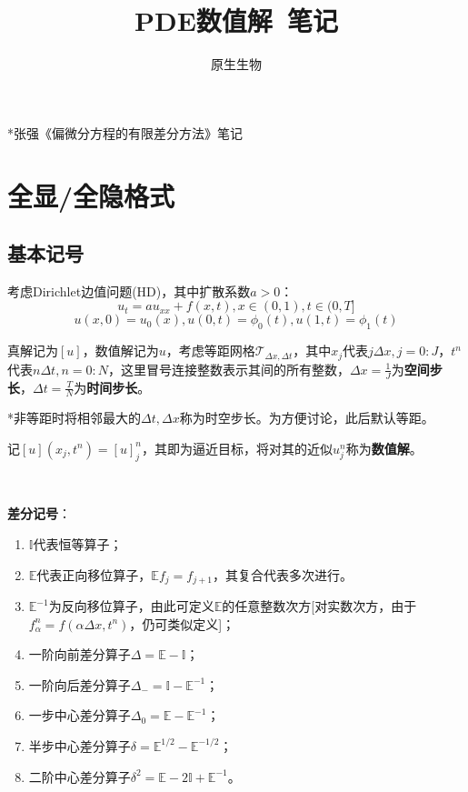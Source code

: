 \documentclass[a4paper,UTF8,fontset=windows]{ctexart}
\title{\textbf{PDE数值解\ 笔记}}
\author{原生生物}
\date{}
\begin{document}
\maketitle

*张强《偏微分方程的有限差分方法》笔记

\tableofcontents

\newpage

\section{全显/全隐格式}
\subsection{基本记号}
考虑Dirichlet边值问题(HD)，其中扩散系数$a>0$：
$$u_t=au_{xx}+f(x,t),x\in(0,1),t\in(0,T]$$
$$u(x,0)=u_0(x),u(0,t)=\phi_0(t),u(1,t)=\phi_1(t)$$

真解记为$[u]$，数值解记为$u$，考虑等距网格$\mathcal{T}_{\Delta x,\Delta t}$，其中$x_j$代表$j\Delta x,j=0:J$，$t^n$代表$n\Delta t,n=0:N$，这里冒号连接整数表示其间的所有整数，$\Delta x=\frac{1}{J}$为\textbf{空间步长}，$\Delta t=\frac{T}{N}$为\textbf{时间步长}。

*非等距时将相邻最大的$\Delta t,\Delta x$称为时空步长。为方便讨论，此后默认等距。

记$[u](x_j,t^n)=[u]_j^n$，其即为逼近目标，将对其的近似$u_j^n$称为\textbf{数值解}。

\

\textbf{差分记号}：
\begin{enumerate}
    \item $\mathbb{I}$代表恒等算子；
    \item $\mathbb{E}$代表正向移位算子，$\mathbb{E}f_j=f_{j+1}$，其复合代表多次进行。
    \item $\mathbb{E}^{-1}$为反向移位算子，由此可定义$\mathbb{E}$的任意整数次方[对实数次方，由于$f_\alpha^n=f(\alpha\Delta x,t^n)$，仍可类似定义]；
    \item 一阶向前差分算子$\Delta=\mathbb{E}-\mathbb{I}$；
    \item 一阶向后差分算子$\Delta_-=\mathbb{I}-\mathbb{E}^{-1}$；
    \item 一步中心差分算子$\Delta_0=\mathbb{E}-\mathbb{E}^{-1}$；
    \item 半步中心差分算子$\delta=\mathbb{E}^{1/2}-\mathbb{E}^{-1/2}$；
    \item 二阶中心差分算子$\delta^2=\mathbb{E}-2\mathbb{I}+\mathbb{E}^{-1}$。
\end{enumerate}
\end{document}
